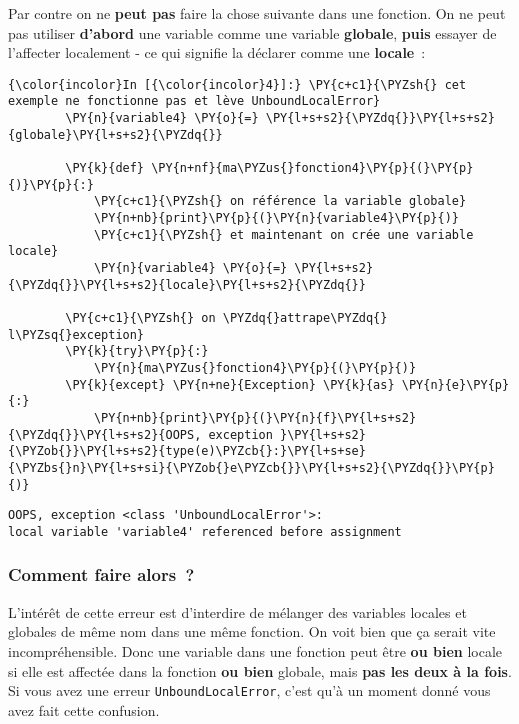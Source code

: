     Par contre on ne \textbf{peut pas} faire la chose suivante dans une
fonction. On ne peut pas utiliser \textbf{d'abord} une variable comme
une variable \textbf{globale}, \textbf{puis} essayer de l'affecter
localement - ce qui signifie la déclarer comme une \textbf{locale}~:

    \begin{Verbatim}[commandchars=\\\{\}]
{\color{incolor}In [{\color{incolor}4}]:} \PY{c+c1}{\PYZsh{} cet exemple ne fonctionne pas et lève UnboundLocalError}
        \PY{n}{variable4} \PY{o}{=} \PY{l+s+s2}{\PYZdq{}}\PY{l+s+s2}{globale}\PY{l+s+s2}{\PYZdq{}}
        
        \PY{k}{def} \PY{n+nf}{ma\PYZus{}fonction4}\PY{p}{(}\PY{p}{)}\PY{p}{:}
            \PY{c+c1}{\PYZsh{} on référence la variable globale}
            \PY{n+nb}{print}\PY{p}{(}\PY{n}{variable4}\PY{p}{)}
            \PY{c+c1}{\PYZsh{} et maintenant on crée une variable locale}
            \PY{n}{variable4} \PY{o}{=} \PY{l+s+s2}{\PYZdq{}}\PY{l+s+s2}{locale}\PY{l+s+s2}{\PYZdq{}}
        
        \PY{c+c1}{\PYZsh{} on \PYZdq{}attrape\PYZdq{} l\PYZsq{}exception}
        \PY{k}{try}\PY{p}{:}
            \PY{n}{ma\PYZus{}fonction4}\PY{p}{(}\PY{p}{)}
        \PY{k}{except} \PY{n+ne}{Exception} \PY{k}{as} \PY{n}{e}\PY{p}{:}
            \PY{n+nb}{print}\PY{p}{(}\PY{n}{f}\PY{l+s+s2}{\PYZdq{}}\PY{l+s+s2}{OOPS, exception }\PY{l+s+s2}{\PYZob{}}\PY{l+s+s2}{type(e)\PYZcb{}:}\PY{l+s+se}{\PYZbs{}n}\PY{l+s+si}{\PYZob{}e\PYZcb{}}\PY{l+s+s2}{\PYZdq{}}\PY{p}{)}
\end{Verbatim}


    \begin{Verbatim}[commandchars=\\\{\}]
OOPS, exception <class 'UnboundLocalError'>:
local variable 'variable4' referenced before assignment

    \end{Verbatim}

    \hypertarget{comment-faire-alors}{%
\subsubsection{Comment faire alors~?}\label{comment-faire-alors}}

    L'intérêt de cette erreur est d'interdire de mélanger des variables
locales et globales de même nom dans une même fonction. On voit bien que
ça serait vite incompréhensible. Donc une variable dans une fonction
peut être \textbf{ou bien} locale si elle est affectée dans la fonction
\textbf{ou bien} globale, mais \textbf{pas les deux à la fois}. Si vous
avez une erreur \texttt{UnboundLocalError}, c'est qu'à un moment donné
vous avez fait cette confusion.


